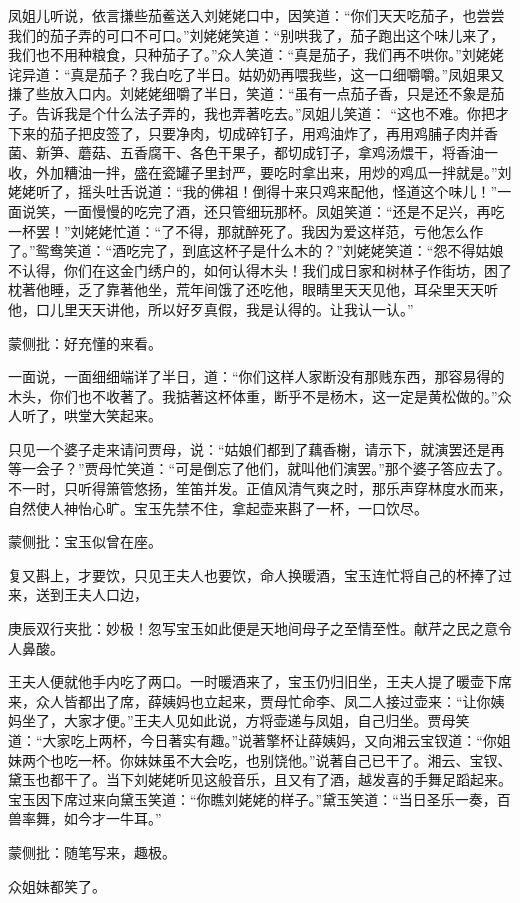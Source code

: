\begin{parag}
凤姐儿听说，依言搛些茄鲝送入刘姥姥口中，因笑道：“你们天天吃茄子，也尝尝我们的茄子弄的可口不可口。”刘姥姥笑道：“别哄我了，茄子跑出这个味儿来了，我们也不用种粮食，只种茄子了。”众人笑道：“真是茄子，我们再不哄你。”刘姥姥诧异道：“真是茄子？我白吃了半日。姑奶奶再喂我些，这一口细嚼嚼。”凤姐果又搛了些放入口内。刘姥姥细嚼了半日，笑道：“虽有一点茄子香，只是还不象是茄子。告诉我是个什么法子弄的，我也弄著吃去。”凤姐儿笑道： “这也不难。你把才下来的茄子把皮签了，只要净肉，切成碎钉子，用鸡油炸了，再用鸡脯子肉并香菌、新笋、蘑菇、五香腐干、各色干果子，都切成钉子，拿鸡汤煨干，将香油一收，外加糟油一拌，盛在瓷罐子里封严，要吃时拿出来，用炒的鸡瓜一拌就是。”刘姥姥听了，摇头吐舌说道：“我的佛祖！倒得十来只鸡来配他，怪道这个味儿！”一面说笑，一面慢慢的吃完了酒，还只管细玩那杯。凤姐笑道：“还是不足兴，再吃一杯罢！”刘姥姥忙道：“了不得，那就醉死了。我因为爱这样范，亏他怎么作了。”鸳鸯笑道：“酒吃完了，到底这杯子是什么木的？”刘姥姥笑道：“怨不得姑娘不认得，你们在这金门绣户的，如何认得木头！我们成日家和树林子作街坊，困了枕著他睡，乏了靠著他坐，荒年间饿了还吃他，眼睛里天天见他，耳朵里天天听他，口儿里天天讲他，所以好歹真假，我是认得的。让我认一认。”\begin{note}蒙侧批：好充懂的来看。\end{note}一面说，一面细细端详了半日，道：“你们这样人家断没有那贱东西，那容易得的木头，你们也不收著了。我掂著这杯体重，断乎不是杨木，这一定是黄松做的。”众人听了，哄堂大笑起来。
\end{parag}


\begin{parag}
    只见一个婆子走来请问贾母，说：“姑娘们都到了藕香榭，请示下，就演罢还是再等一会子？”贾母忙笑道：“可是倒忘了他们，就叫他们演罢。”那个婆子答应去了。不一时，只听得箫管悠扬，笙笛并发。正值风清气爽之时，那乐声穿林度水而来，自然使人神怡心旷。宝玉先禁不住，拿起壶来斟了一杯，一口饮尽。\begin{note}蒙侧批：宝玉似曾在座。\end{note}复又斟上，才要饮，只见王夫人也要饮，命人换暖酒，宝玉连忙将自己的杯捧了过来，送到王夫人口边，\begin{note}庚辰双行夹批：妙极！忽写宝玉如此便是天地间母子之至情至性。献芹之民之意令人鼻酸。\end{note}王夫人便就他手内吃了两口。一时暖酒来了，宝玉仍归旧坐，王夫人提了暖壶下席来，众人皆都出了席，薛姨妈也立起来，贾母忙命李、凤二人接过壶来：“让你姨妈坐了，大家才便。”王夫人见如此说，方将壶递与凤姐，自己归坐。贾母笑道：“大家吃上两杯，今日著实有趣。”说著擎杯让薛姨妈，又向湘云宝钗道：“你姐妹两个也吃一杯。你妹妹虽不大会吃，也别饶他。”说著自己已干了。湘云、宝钗、黛玉也都干了。当下刘姥姥听见这般音乐，且又有了酒，越发喜的手舞足蹈起来。宝玉因下席过来向黛玉笑道：“你瞧刘姥姥的样子。”黛玉笑道：“当日圣乐一奏，百兽率舞，如今才一牛耳。”\begin{note}蒙侧批：随笔写来，趣极。\end{note}众姐妹都笑了。
\end{parag}



